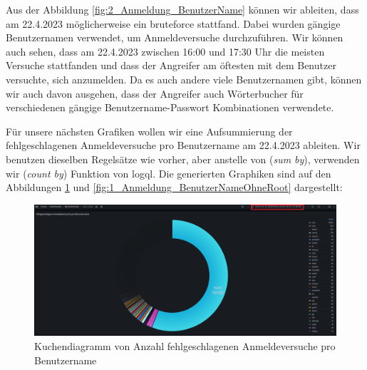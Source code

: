 Aus der Abbildung \ref{fig:2_Anmeldung_BenutzerName} können wir ableiten, dass am 22.4.2023 möglicherweise ein \gls{bruteforce} stattfand. Dabei wurden gängige Benutzernamen verwendet, um Anmeldeversuche durchzuführen. Wir können auch sehen, dass am 22.4.2023 zwischen 16:00 und 17:30 Uhr die meisten Versuche stattfanden und dass der Angreifer am öftesten mit dem Benutzer  versuchte, sich anzumelden. Da es auch andere viele Benutzernamen gibt, können wir auch davon ausgehen, dass der Angreifer auch Wörterbucher für verschiedenen gängige Benutzername-Passwort Kombinationen verwendete.


Für unsere nächsten Grafiken wollen wir eine Aufsummierung der fehlgeschlagenen Anmeldeversuche pro Benutzername am 22.4.2023 ableiten. Wir benutzen dieselben Regelsätze wie vorher, aber anstelle von (\textit{sum by}), verwenden wir (\textit{count by}) Funktion von \gls{logql}. Die generierten Graphiken sind auf den Abbildungen \ref{fig:1_Anmeldung_BenutzerName} und \ref{fig:1_Anmeldung_BenutzerNameOhneRoot} dargestellt:

\newpage
{}
\thispagestyle{lscape}
\begin{landscape}
    \begin{figure}[H]
        \centerline{\includegraphics[width=1.7\textwidth]{assets/Failed_pro_user.png}}
        \caption[Kuchendiagramm von Anzahl fehlgeschlagenen Anmeldeversuche pro Benutzername]
        {Kuchendiagramm von Anzahl fehlgeschlagenen Anmeldeversuche pro Benutzername}
        \label{fig:1_Anmeldung_BenutzerName}
        \centering
    \end{figure}
\end{landscape}
\restoregeometry

